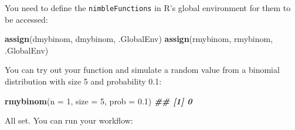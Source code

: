 \documentclass[
  12pt,
]{krantz}
\newenvironment{Shaded}{\begin{snugshade}}{\end{snugshade}}
\newcommand{\AttributeTok}[1]{\textcolor[rgb]{0.13,0.29,0.53}{#1}}
\newcommand{\DecValTok}[1]{\textcolor[rgb]{0.00,0.00,0.81}{#1}}
\newcommand{\DocumentationTok}[1]{\textcolor[rgb]{0.56,0.35,0.01}{\textbf{\textit{#1}}}}
\newcommand{\FloatTok}[1]{\textcolor[rgb]{0.00,0.00,0.81}{#1}}
\newcommand{\FunctionTok}[1]{\textcolor[rgb]{0.13,0.29,0.53}{\textbf{#1}}}
\newcommand{\NormalTok}[1]{#1}
\newcommand{\StringTok}[1]{\textcolor[rgb]{0.31,0.60,0.02}{#1}}
\begin{document}
You need to define the \texttt{nimbleFunctions} in R's global environment for them to be accessed:

\begin{Shaded}
\begin{Highlighting}[]
\FunctionTok{assign}\NormalTok{(}\StringTok{\textquotesingle{}dmybinom\textquotesingle{}}\NormalTok{, dmybinom, .GlobalEnv)}
\FunctionTok{assign}\NormalTok{(}\StringTok{\textquotesingle{}rmybinom\textquotesingle{}}\NormalTok{, rmybinom, .GlobalEnv)}
\end{Highlighting}
\end{Shaded}

You can try out your function and simulate a random value from a binomial distribution with size 5 and probability 0.1:

\begin{Shaded}
\begin{Highlighting}[]
\FunctionTok{rmybinom}\NormalTok{(}\AttributeTok{n =} \DecValTok{1}\NormalTok{, }\AttributeTok{size =} \DecValTok{5}\NormalTok{, }\AttributeTok{prob =} \FloatTok{0.1}\NormalTok{)}
\DocumentationTok{\#\# [1] 0}
\end{Highlighting}
\end{Shaded}

All set. You can run your workflow:
\end{document}
